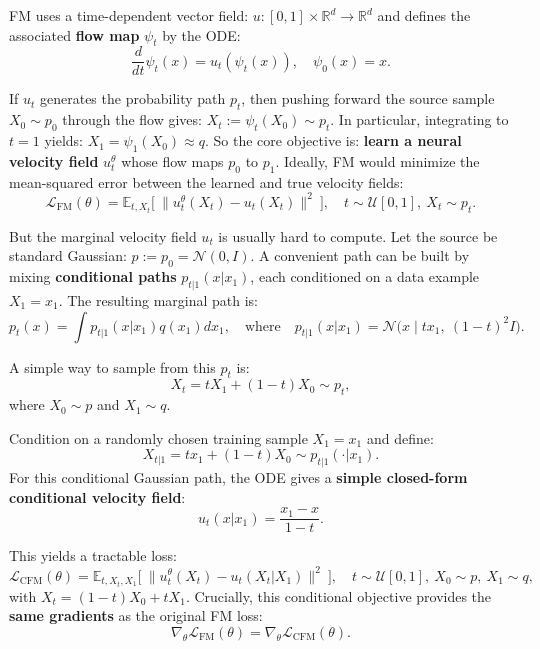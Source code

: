 \documentclass[11pt]{article}
\begin{document}
FM uses a time-dependent vector field: $u : [0,1]\times \mathbb{R}^d \to \mathbb{R}^d$ and defines the associated \textbf{flow map} $\psi_t$ by the ODE:
\begin{equation}
\frac{d}{dt}\psi_t(x) = u_t(\psi_t(x)), \quad \psi_0(x)=x.
\end{equation}

If $u_t$ generates the probability path $p_t$, then pushing forward the source sample $X_0\sim p_0$ through the flow gives: $X_t := \psi_t(X_0) \sim p_t$. In particular, integrating to $t=1$ yields: $X_1=\psi_1(X_0) \approx q$. So the core objective is: \textbf{learn a neural velocity field} $u^\theta_t$ whose flow maps $p_0$ to $p_1$. Ideally, FM would minimize the mean-squared error between the learned and true velocity fields:
\begin{equation}
\mathcal{L}_{\text{FM}}(\theta)=\mathbb{E}_{t,X_t}\Big[\ \|u^\theta_t(X_t)-u_t(X_t)\|^2\ \Big],
\quad t\sim \mathcal{U}[0,1],\ X_t\sim p_t.
\end{equation}

But the marginal velocity field $u_t$ is usually hard to compute. Let the source be standard Gaussian: $p := p_0 = \mathcal{N}(0,I)$. A convenient path can be built by mixing \textbf{conditional paths} $p_{t|1}(x|x_1)$, each conditioned on a data example $X_1=x_1$. The resulting marginal path is:
\begin{equation}
p_t(x)=\int p_{t|1}(x|x_1) q(x_1) dx_1,
\quad\text{where}\quad
p_{t|1}(x|x_1)=\mathcal{N}\big(x\mid t x_1,\ (1-t)^2 I\big).
\end{equation}

A simple way to sample from this $p_t$ is:
\begin{equation}
X_t = tX_1 + (1-t)X_0 \sim p_t,
\end{equation}
where $X_0\sim p$ and $X_1\sim q$.

Condition on a randomly chosen training sample $X_1=x_1$ and define:
\begin{equation}
X_{t|1}=t x_1+(1-t)X_0 \sim p_{t|1}(\cdot|x_1).
\end{equation}
For this conditional Gaussian path, the ODE gives a \textbf{simple closed-form conditional velocity field}:
\begin{equation}
u_t(x|x_1)=\frac{x_1-x}{1-t}.
\end{equation}

This yields a tractable loss:
\begin{equation}
\mathcal{L}_{\text{CFM}}(\theta)=
\mathbb{E}_{t,X_t,X_1}\Big[\ \|u^\theta_t(X_t)-u_t(X_t|X_1)\|^2\ \Big],
\quad t\sim\mathcal{U}[0,1],\ X_0\sim p,\ X_1\sim q,
\end{equation}
with $X_t=(1-t)X_0+tX_1$. Crucially, this conditional objective provides the \textbf{same gradients} as the original FM loss:
\begin{equation}
\nabla_\theta \mathcal{L}_{\text{FM}}(\theta)=\nabla_\theta \mathcal{L}_{\text{CFM}}(\theta).
\end{equation}
\end{document}

